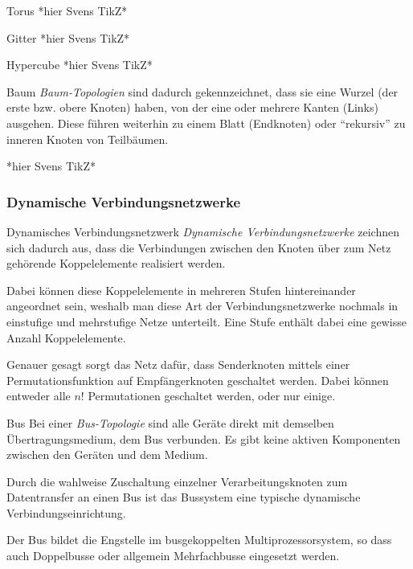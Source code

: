 \begin{defi}{Torus}
    *hier Svens TikZ*
\end{defi}

\begin{defi}{Gitter}
    *hier Svens TikZ*
\end{defi}

\begin{defi}{Hypercube}
    *hier Svens TikZ*
\end{defi}

\begin{defi}{Baum}
    \emph{Baum-Topologien} sind dadurch gekennzeichnet, dass sie eine Wurzel (der erste bzw. obere Knoten) haben, von der eine oder mehrere Kanten (Links) ausgehen.
    Diese führen weiterhin zu einem Blatt (Endknoten) oder \enquote{rekursiv} zu inneren Knoten von Teilbäumen.

    *hier Svens TikZ*
\end{defi}

\subsubsection{Dynamische Verbindungsnetzwerke}

\begin{defi}{Dynamisches Verbindungsnetzwerk}
    \emph{Dynamische Verbindungsnetzwerke} zeichnen sich dadurch aus, dass die Verbindungen zwischen den Knoten über zum Netz gehörende Koppelelemente realisiert werden.

    Dabei können diese Koppelelemente in mehreren Stufen hintereinander angeordnet sein, weshalb man diese Art der Verbindungsnetzwerke nochmals in einstufige und mehrstufige Netze unterteilt.
    Eine Stufe enthält dabei eine gewisse Anzahl Koppelelemente.

    Genauer gesagt sorgt das Netz dafür, dass Senderknoten mittels einer Permutationsfunktion auf Empfängerknoten geschaltet werden.
    Dabei können entweder alle $n!$ Permutationen geschaltet werden, oder nur einige.
\end{defi}

\begin{defi}{Bus}
    Bei einer \emph{Bus-Topologie} sind alle Geräte direkt mit demselben Übertragungsmedium, dem Bus verbunden.
    Es gibt keine aktiven Komponenten zwischen den Geräten und dem Medium.

    Durch die wahlweise Zuschaltung einzelner Verarbeitungsknoten zum Datentransfer an einen Bus ist das Bussystem eine typische dynamische Verbindungseinrichtung.

    Der Bus bildet die Engstelle im busgekoppelten Multiprozessorsystem, so dass auch Doppelbusse oder allgemein Mehrfachbusse eingesetzt werden.
\end{defi}

